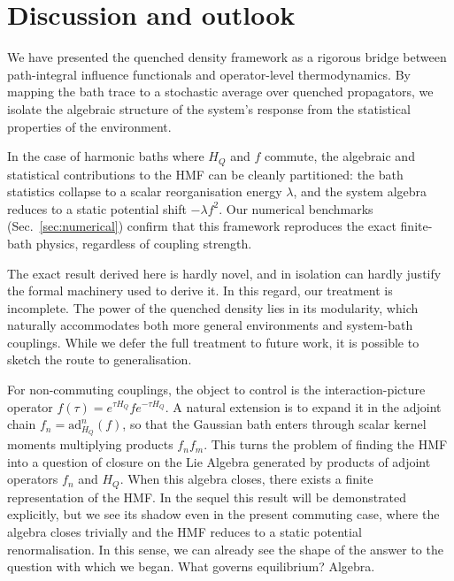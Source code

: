 \documentclass[aps,prl,twocolumn,superscriptaddress,showpacs,floatfix]{revtex4-2}
\begin{document}
 \section{Discussion and outlook}
\label{sec:discussion}

We have presented the quenched density framework as a rigorous bridge between path-integral influence functionals and operator-level thermodynamics. By mapping the bath trace to a stochastic average over quenched propagators, we isolate the algebraic structure of the system's response from the statistical properties of the environment.

In the case of harmonic baths where $H_Q$ and $f$ commute, the algebraic and statistical contributions to the HMF can be cleanly partitioned: the bath statistics collapse to a scalar reorganisation energy $\lambda$, and the system algebra reduces to a static potential shift $-\lambda f^2$. Our numerical benchmarks (Sec.~\ref{sec:numerical}) confirm that this framework reproduces the exact finite-bath physics, regardless of coupling strength.

The exact result derived here is hardly novel, and in isolation can hardly justify the formal machinery used to derive it. In this regard, our treatment is incomplete. The power of the quenched density lies in its modularity, which naturally accommodates both more general environments and system-bath couplings. While we defer the full treatment to future work, it is possible to sketch the route to generalisation. 

For non-commuting couplings, the object to control is the interaction-picture operator $f(\tau)=e^{\tau H_Q}fe^{-\tau H_Q}$. A natural extension is to expand it in the adjoint chain $f_n=\mathrm{ad}_{H_Q}^n(f)$, so that the Gaussian bath enters through scalar kernel moments multiplying products $f_n f_m$. This turns the problem of finding the HMF into a question of closure on the Lie Algebra generated by products of adjoint operators $f_n$ and $H_Q$. When this algebra closes, there exists a finite representation of the HMF. In the sequel this result will be demonstrated explicitly, but we see its shadow even in the present commuting case, where the algebra closes trivially and the HMF reduces to a static potential renormalisation. In this sense, we can already see the shape of the answer to the question with which we began. What governs equilibrium? Algebra.

 


\end{document}
